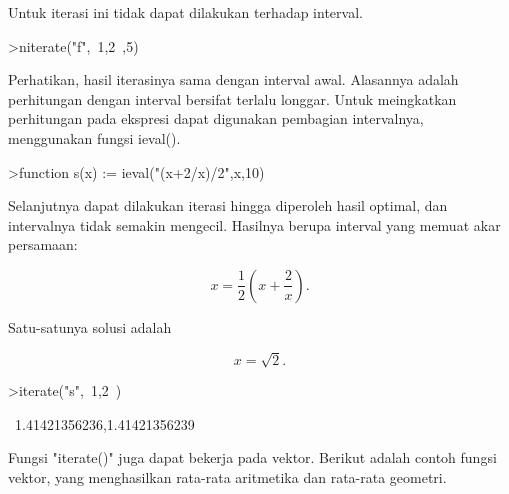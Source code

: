 \documentclass{article}
\newenvironment{eulernotebook}{\par}{\par}
\newenvironment{eulercomment}{\par\medskip}{\par\medskip}
\newenvironment{eulerformula}{}{}
\begin{document}
\begin{eulernotebook}
\begin{eulercomment}
\begin{eulercomment}
\begin{eulercomment}
\begin{eulercomment}
\begin{eulercomment}
\begin{eulercomment}
\begin{euleroutput}
\end{euleroutput}
\begin{eulercomment}
Untuk iterasi ini tidak dapat dilakukan terhadap interval.
\end{eulercomment}
\begin{eulerprompt}
>niterate("f",~1,2~,5)
\end{eulerprompt}
\begin{euleroutput}
  [ ~1,2~,  ~1,2~,  ~1,2~,  ~1,2~,  ~1,2~,  ~1,2~ ]
\end{euleroutput}
\begin{eulercomment}
Perhatikan, hasil iterasinya sama dengan interval awal. Alasannya adalah perhitungan dengan
interval bersifat terlalu longgar. Untuk meingkatkan perhitungan pada ekspresi dapat
digunakan pembagian intervalnya, menggunakan fungsi ieval().
\end{eulercomment}
\begin{eulerprompt}
>function s(x) := ieval("(x+2/x)/2",x,10)
\end{eulerprompt}
\begin{eulercomment}
Selanjutnya dapat dilakukan iterasi hingga diperoleh hasil optimal, dan intervalnya tidak
semakin mengecil. Hasilnya berupa interval yang memuat akar persamaan:

\end{eulercomment}
\begin{eulerformula}
\[
x = \frac{1}{2} \left( x + \frac{2}{x} \right).
\]
\end{eulerformula}
\begin{eulercomment}
Satu-satunya solusi adalah\\
\end{eulercomment}
\begin{eulerformula}
\[
x = \sqrt2.
\]
\end{eulerformula}
\begin{eulerprompt}
>iterate("s",~1,2~)
\end{eulerprompt}
\begin{euleroutput}
  ~1.41421356236,1.41421356239~
\end{euleroutput}
\begin{eulercomment}
Fungsi "iterate()" juga dapat bekerja pada vektor. Berikut adalah contoh fungsi vektor, yang
menghasilkan rata-rata aritmetika dan rata-rata geometri.


\end{eulercomment}
\end{eulercomment}
\end{eulercomment}
\end{eulercomment}
\end{eulercomment}
\end{eulercomment}
\end{eulercomment}
\end{eulernotebook}
\end{document}
